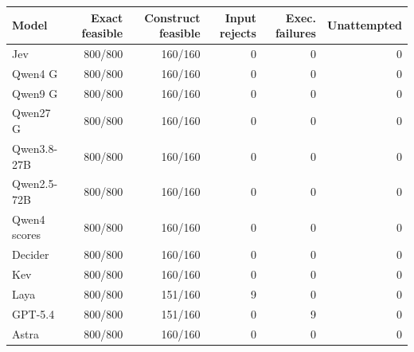 \begin{tabular}{lrrrrr}
\toprule
Model & Exact feasible & Construct feasible & Input rejects & Exec. failures & Unattempted \\
\midrule
Jev & 800/800 & 160/160 & 0 & 0 & 0 \\
Qwen4 G & 800/800 & 160/160 & 0 & 0 & 0 \\
Qwen9 G & 800/800 & 160/160 & 0 & 0 & 0 \\
Qwen27 G & 800/800 & 160/160 & 0 & 0 & 0 \\
Qwen3.8-27B & 800/800 & 160/160 & 0 & 0 & 0 \\
Qwen2.5-72B & 800/800 & 160/160 & 0 & 0 & 0 \\
Qwen4 scores & 800/800 & 160/160 & 0 & 0 & 0 \\
Decider & 800/800 & 160/160 & 0 & 0 & 0 \\
Kev & 800/800 & 160/160 & 0 & 0 & 0 \\
Laya & 800/800 & 151/160 & 9 & 0 & 0 \\
\midrule
GPT-5.4 & 800/800 & 151/160 & 0 & 9 & 0 \\
Astra & 800/800 & 160/160 & 0 & 0 & 0 \\
\bottomrule
\end{tabular}
